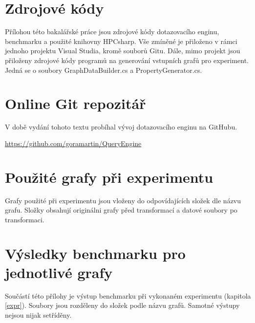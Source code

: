 \section{Zdrojové kódy}
\label{prilohy.kod}

Přílohou této bakalářské práce jsou zdrojové kódy dotazovacího enginu, benchmarku a použité knihovny HPCsharp.
Vše zmíněné je přiloženo v rámci jednoho projektu Visual Studia, kromě souborů Gitu. Dále, mimo projekt jsou přiloženy
zdrojové kódy programů na generování vstupních grafů pro experiment. Jedná se o soubory GraphDataBuilder.cs a PropertyGenerator.cs.

\section{Online Git repozitář}
\label{prilohy.repo}

V době vydání tohoto textu probíhal vývoj dotazovacího enginu na GitHubu.

\begin{center}
\url{https://github.com/goramartin/QueryEngine}
\end{center}

\section{Použité grafy při experimentu}
\label{prilohy.grafy}

Grafy použité při experimentu jsou vloženy do odpovídajících složek dle názvu grafu. Složky obsahují originálni grafy před transformací a datové soubory po transformaci.

\section{Výsledky benchmarku pro jednotlivé grafy}
\label{prilohy.grafyVysledky}

Součástí této přílohy je výstup benchmarku při vykonaném experimentu (kapitola \ref{expr}).
Soubory jsou rozděleny do složek podle názvu grafů.
Samotné výstupy nejsou nijak setříděny.